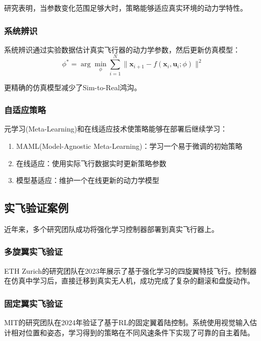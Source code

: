 \documentclass[12pt,a4paper]{ctexart}
\begin{document}
研究表明，当参数变化范围足够大时，策略能够适应真实环境的动力学特性。

\subsubsection{系统辨识}

系统辨识通过实验数据估计真实飞行器的动力学参数，然后更新仿真模型：
\begin{equation}
    \phi^* = \arg\min_\phi \sum_{i=1}^N \|\mathbf{x}_{i+1} - f(\mathbf{x}_i, \mathbf{u}_i; \phi)\|^2
\end{equation}

更精确的仿真模型减少了Sim-to-Real鸿沟。

\subsubsection{自适应策略}

元学习(Meta-Learning)和在线适应技术使策略能够在部署后继续学习：

\begin{enumerate}
    \item MAML(Model-Agnostic Meta-Learning)：学习一个易于微调的初始策略
    \item 在线适应：使用实际飞行数据实时更新策略参数
    \item 模型基适应：维护一个在线更新的动力学模型
\end{enumerate}

\subsection{实飞验证案例}

近年来，多个研究团队成功将强化学习控制器部署到真实飞行器上。

\subsubsection{多旋翼实飞验证}

ETH Zurich的研究团队在2023年展示了基于强化学习的四旋翼特技飞行。控制器在仿真中学习后，直接迁移到真实无人机，成功完成了复杂的翻滚和盘旋动作。

\subsubsection{固定翼实飞验证}

MIT的研究团队在2024年验证了基于RL的固定翼着陆控制。系统使用视觉输入估计相对位置和姿态，学习得到的策略在不同风速条件下实现了可靠的自主着陆。
\end{document}
